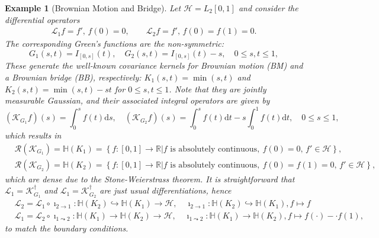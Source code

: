 \documentclass[noinfoline]{imsart}\setcounter{tocdepth}{2}
\renewcommand{\b}[1]{\mathbb{#1}} %
\newcommand{\s}[1]{\mathscr{#1}} %
\renewcommand{\c}[1]{\mathcal{#1}} %
\newcommand{\rd}{\mathrm{d}} %
\theoremstyle{plain}
\newtheorem{example}{Example}[section]
\begin{document}
\begin{example}[Brownian Motion and Bridge]\label{ex:BM2BB}
Let $\c{H} = L_{2}[0,1]$ and consider the differential operators
\begin{align*}
    \s{L}_{1} f = f', \, f(0) = 0, \qquad
    \s{L}_{2} f = f', \, f(0) = f(1) = 0.
\end{align*}
The corresponding Green's functions are the non-symmetric:
\begin{equation*}
    G_{1}(s, t) = I_{[0, s]}(t), \quad G_{2}(s, t) = I_{[0, s]}(t) - s, \quad 0 \le s, t \le 1,
\end{equation*}
These generate the well-known covariance kernels for Brownian motion (BM) and a Brownian bridge (BB), respectively: $K_{1}(s, t) = \min (s, t)$ and $K_{2}(s, t) = \min (s, t) -st$ for $0 \le s, t \le 1$.
Note that they are jointly measurable Gaussian, and their associated integral operators are given by
\begin{equation*}
    (\s{K}_{G_{1}} f) (s) = \int_{0}^{s}  f(t) \rd s, \quad (\s{K}_{G_{2}} f) (s) = \int_{0}^{s}  f(t) \rd t - s \int_{0}^{1} f(t) \rd t, \quad 0 \le s \le 1,
\end{equation*}
which results in
\begin{align*}
    &\c{R}(\s{K}_{G_{1}}) =  \b{H}(K_{1}) = \left\{ f:[0, 1] \rightarrow \b{R} \left. \right\vert f \text{ is absolutely continuous}, \ f(0) = 0, \,  f' \in \c{H} \right\}, \\ 
    &\c{R}(\s{K}_{G_{2}}) =  \b{H}(K_{2}) = \left\{ f:[0, 1] \rightarrow \b{R} \left. \right\vert f \text{ is absolutely continuous}, \ f(0) = f(1) = 0, \,  f' \in \c{H} \right\},
\end{align*}
which are dense due to the Stone-Weierstrass theorem.
It is straightforward that $\s{L}_{1} = \s{K}_{G_{1}}^{\dagger}$ and $\s{L}_{1} = \s{K}_{G_{2}}^{\dagger}$ are just usual differentiations, hence
\begin{align}\label{eq:BM2BB}
    &\s{L}_{2} = \s{L}_{1} \circ \imath_{2 \to 1} : \b{H}(K_{2}) \hookrightarrow \b{H}(K_{1}) \rightarrow \c{H}, \quad \imath_{2 \to 1} : \b{H}(K_{2}) \hookrightarrow \b{H}(K_{1}), f \mapsto f \nonumber \\ 
    &\s{L}_{1} = \s{L}_{2} \circ \imath_{1 \leadsto 2} : \b{H}(K_{1}) \rightarrow \b{H}(K_{2}) \rightarrow \c{H}, \quad \imath_{1 \leadsto 2} : \b{H}(K_{1}) \rightarrow \b{H}(K_{2}), f \mapsto f(\cdot) - \cdot f(1),
\end{align}
to match the boundary conditions. 

\end{example}
\end{document}
